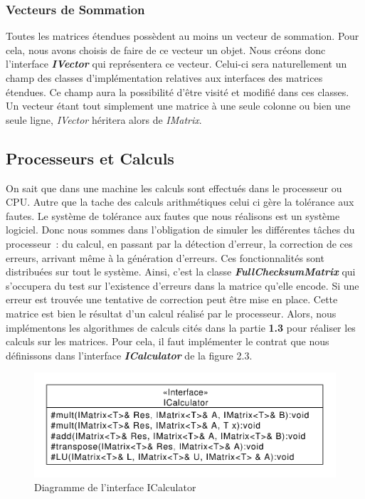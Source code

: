 \documentclass[a4paper,10pt]{report}
\begin{document}
\subsubsection{Vecteurs de Sommation}
Toutes les matrices étendues possèdent au moins un vecteur de sommation. Pour cela, nous avons choisis de faire de 
ce vecteur un objet. Nous créons donc l’interface \textbf{\textit {IVector}} qui représentera ce vecteur. Celui-ci sera 
naturellement un champ des classes d’implémentation relatives aux interfaces des matrices étendues. Ce champ aura la 
possibilité d’être visité et modifié dans ces classes. Un vecteur étant tout simplement une matrice à une seule colonne 
ou bien une seule ligne, \textit{IVector} héritera alors de \textit{IMatrix}.

\subsection{Processeurs et Calculs}
On sait que dans une machine les calculs sont effectués dans le processeur ou CPU. Autre que la tache des calculs 
arithmétiques celui ci gère la tolérance aux fautes. Le système de tolérance aux fautes que nous réalisons est un 
système logiciel. Donc nous sommes dans l’obligation de simuler les différentes tâches du processeur : du calcul, 
en passant par la détection d’erreur, la correction de ces erreurs, arrivant même à la génération d’erreurs. Ces 
fonctionnalités sont distribuées sur tout le système. Ainsi, c’est la classe \textbf{\textit{FullChecksumMatrix}} qui 
s’occupera du test sur l’existence d’erreurs dans la matrice qu’elle encode. Si une erreur est trouvée une tentative 
de correction peut être mise en place. Cette matrice est bien le résultat d’un calcul réalisé par le processeur. 
Alors, nous implémentons les algorithmes de calculs cités dans la partie \textbf{1.3} pour réaliser les calculs sur 
les matrices. Pour cela, il faut implémenter le contrat que nous définissons dans l’interface \textbf{\textit{ICalculator}} 
de la figure 2.3.\newline
\begin{figure}
 \center
 \includegraphics[scale=0.35]{ICalculator.pdf}
 \caption{Diagramme de l'interface ICalculator}
\end{figure}
\end{document}
